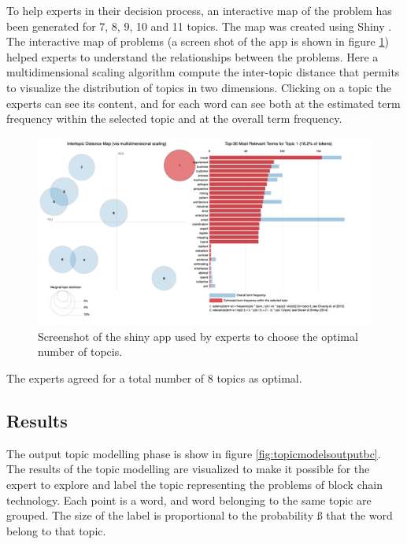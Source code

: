 \documentclass[]{book}
\theoremstyle{definition}
\theoremstyle{definition}
\theoremstyle{definition}
\theoremstyle{remark}
\begin{document}
To help experts in their decision process, an interactive map of the
problem has been generated for 7, 8, 9, 10 and 11 topics. The map was
created using Shiny \citep{shiny2017}. The interactive map of problems
(a screen shot of the app is shown in figure
\ref{fig:topicmodelschinybc}) helped experts to understand the
relationships between the problems. Here a multidimensional scaling
algorithm compute the inter-topic distance that permits to visualize the
distribution of topics in two dimensions. Clicking on a topic the
experts can see its content, and for each word can see both at the
estimated term frequency within the selected topic and at the overall
term frequency.

\begin{figure}

{\centering \includegraphics[width=0.8\linewidth]{_bookdown_files/figures/bc_topicmodel_shiny} 

}

\caption{Screenshot of the shiny app used by experts to choose the optimal number of topcis. }\label{fig:topicmodelschinybc}
\end{figure}

The experts agreed for a total number of 8 topics as optimal.

\subsection{Results}\label{results-5}

The output topic modelling phase is show in figure
\ref{fig:topicmodelsoutputbc}. The results of the topic modelling are
visualized to make it possible for the expert to explore and label the
topic representing the problems of block chain technology. Each point is
a word, and word belonging to the same topic are grouped. The size of
the label is proportional to the probability ß that the word belong to
that topic.
\end{document}
